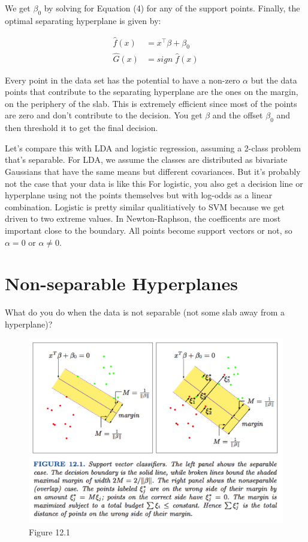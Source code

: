 \documentclass[a4paper]{article}
\begin{document}
We get $\beta_0$ by solving for Equation (4) for any of the support points.  Finally, the optimal separating hyperplane is given by:

\begin{align*}
\hat{f}(x) &= x^\top \beta + \beta_0 \\
\hat{G}(x) &= sign \; \hat{f}(x)
\end{align*}

Every point in the data set has the potential to have a non-zero $\alpha$ but the data points that contribute to the separating hyperplane are the ones on the margin, on the periphery of the slab.  This is extremely efficient since most of the points are zero and don't contribute to the decision.  You get $\beta$ and the offset $\beta_0$ and then threshold it to get the final decision.

Let's compare this with LDA and logistic regression, assuming a 2-class problem that's separable.  For LDA, we assume the classes are distributed as bivariate Gaussians that have the same means but different covariances.  But it's probably not the case that your data is like this  For logistic, you also get a decision line or hyperplane using not the points themselves but with log-odds as a linear combination.  Logistic is pretty similar qualitiatively to SVM because we get driven to two extreme values.  In Newton-Raphson, the coefficents are most important close to the boundary.  All points become support vectors or not, so $\alpha=0$ or $\alpha \neq 0$.

\section{Non-separable Hyperplanes}

What do you do when the data is not separable (not some slab away from a hyperplane)?

\begin{figure}
\centering
\includegraphics[width=1.0\textwidth]{fig12_1.png}
\caption{\label{fig:svm2}Figure 12.1}
\end{figure}
\end{document}
